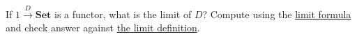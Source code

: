 If $1 \xrightarrow{D}\mathbf{Set}$ is a functor, what is the limit of $D$? Compute using the \href{doc/1 math/Seven Sketches in Compositionality/Chapter 3: Databases/5 Introduction to limits and colimits/3 Finite limits in Set/1 Limit formula}{limit formula} and check answer against \href{doc/1 math/Seven Sketches in Compositionality/Chapter 3: Databases/5 Introduction to limits and colimits/2 Limits/5 Limit}{the limit definition}.